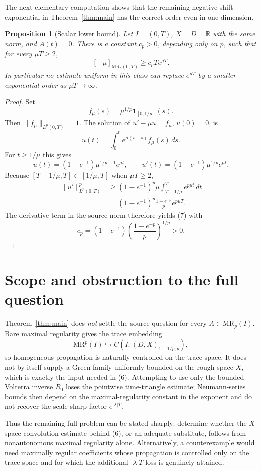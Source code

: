 \documentclass[11pt]{article}
\newtheorem{proposition}[theorem]{Proposition}
\newcommand{\R}{\mathbb R}
\newcommand{\MR}{\mathrm{MR}^p}
\begin{document}
The next elementary computation shows that the remaining negative-shift
exponential in Theorem~\ref{thm:main} has the correct order even in one
dimension.

\begin{proposition}[Scalar lower bound]\label{prop:sharp}
Let $I=(0,T)$, $X=D=\R$ with the same norm, and $A(t)=0$.  There is a
constant $c_p>0$, depending only on $p$, such that for every $\mu T\ge2$,
\[
 [-\mu]_{\mathrm{MR}_p(0,T)}\ge c_p T e^{\mu T}.
 \tag{7}
\]
In particular no estimate uniform in this class can replace
$e^{\mu T}$ by a smaller exponential order as $\mu T\to\infty$.
\end{proposition}

\begin{proof}
Set
\[
 f_\mu(s)=\mu^{1/p}\mathbf 1_{[0,1/\mu]}(s).
\]
Then $\|f_\mu\|_{L^p(0,T)}=1$.  The solution of
$u'-\mu u=f_\mu$, $u(0)=0$, is
\[
 u(t)=\int_0^t e^{\mu(t-s)}f_\mu(s)\,ds.
\]
For $t\ge1/\mu$ this gives
\[
 u(t)=(1-e^{-1})\mu^{1/p-1}e^{\mu t},
 \qquad
 u'(t)=(1-e^{-1})\mu^{1/p}e^{\mu t}.
\]
Because $[T-1/\mu,T]\subset[1/\mu,T]$ when $\mu T\ge2$,
\begin{align*}
 \|u'\|_{L^p(0,T)}^p
 &\ge (1-e^{-1})^p\mu
       \int_{T-1/\mu}^{T}e^{p\mu t}\,dt\\
 &= (1-e^{-1})^p\frac{1-e^{-p}}p e^{p\mu T}.
\end{align*}
The derivative term in the source norm therefore yields (7) with
\[
 c_p=(1-e^{-1})\left(\frac{1-e^{-p}}p\right)^{1/p}>0.
\]
\end{proof}

\section{Scope and obstruction to the full question}

Theorem~\ref{thm:main} does \emph{not} settle the source question for every
$A\in\mathrm{MR}_p(I)$.  Bare maximal regularity gives the trace embedding
\[
 \MR(I)\hookrightarrow C(\overline I;(D,X)_{1-1/p,p}),
\]
so homogeneous propagation is naturally controlled on the trace space.
It does not by itself supply a Green family uniformly bounded on the rough
space $X$, which is exactly the input needed in (6).  Attempting to use only
the bounded Volterra inverse $R_0$ loses the pointwise time-triangle estimate;
Neumann-series bounds then depend on the maximal-regularity constant in the
exponent and do not recover the scale-sharp factor $e^{|\lambda|T}$.

Thus the remaining full problem can be stated sharply: determine whether
the $X$-space convolution estimate behind (6), or an adequate substitute,
follows from nonautonomous maximal regularity alone.  Alternatively, a
counterexample would need maximally regular coefficients whose propagation
is controlled only on the trace space and for which the additional
$|\lambda|T$ loss is genuinely attained.
\end{document}
